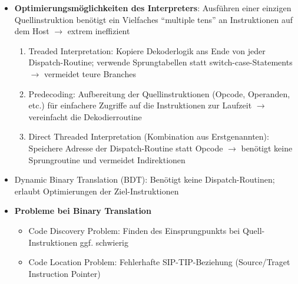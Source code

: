 \begin{itemize}
	\item \textbf{Optimierungsmöglichkeiten des Interpreters}: Ausführen einer einzigen Quellinstruktion benötigt ein Vielfaches "`multiple tens"' an Instruktionen auf dem Host \(\rightarrow\) extrem ineffizient
	\begin{enumerate} %
		\item Treaded Interpretation: Kopiere Dekoderlogik ans Ende von jeder Dispatch-Routine; verwende Sprungtabellen statt switch-case-Statements \(\rightarrow\) vermeidet teure Branches
		\item Predecoding: Aufbereitung der Quellinstruktionen (Opcode, Operanden, etc.) für einfachere Zugriffe auf die Instruktionen zur Laufzeit \(\rightarrow\) vereinfacht die Dekodierroutine
		\item Direct Threaded Interpretation (Kombination aus Erstgenannten): Speichere Adresse der Dispatch-Routine statt Opcode \(\rightarrow\) benötigt keine Sprungroutine und vermeidet Indirektionen 
	\end{enumerate}
	\item Dynamic Binary Translation (BDT): Benötigt keine Dispatch-Routinen; erlaubt Optimierungen der Ziel-Instruktionen
	\item \textbf{Probleme bei Binary Translation}
	\begin{itemize}
		\item Code Discovery Problem: Finden des Einsprungpunkts bei Quell-Instruktionen ggf. schwierig
		\item Code Location Problem: Fehlerhafte SIP-TIP-Beziehung (Source/Traget Instruction Pointer)
	\end{itemize}
\end{itemize}




























